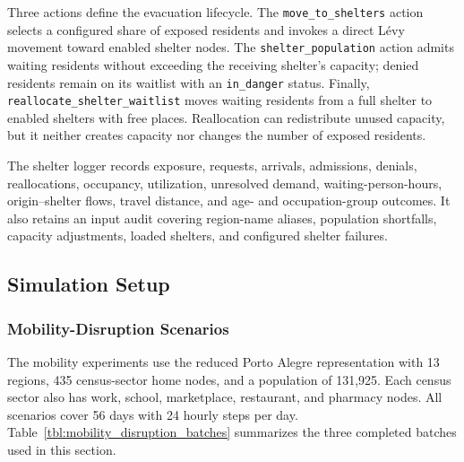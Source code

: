 Three actions define the evacuation lifecycle. The \texttt{move\_to\_shelters} action selects a configured share of exposed residents and invokes a direct L\'evy movement toward enabled shelter nodes. The \texttt{shelter\_population} action admits waiting residents without exceeding the receiving shelter's capacity; denied residents remain on its waitlist with an \texttt{in\_danger} status. Finally, \texttt{reallocate\_shelter\_waitlist} moves waiting residents from a full shelter to enabled shelters with free places. Reallocation can redistribute unused capacity, but it neither creates capacity nor changes the number of exposed residents.

The shelter logger records exposure, requests, arrivals, admissions, denials, reallocations, occupancy, utilization, unresolved demand, waiting-person-hours, origin--shelter flows, travel distance, and age- and occupation-group outcomes. It also retains an input audit covering region-name aliases, population shortfalls, capacity adjustments, loaded shelters, and configured shelter failures.

\subsection{Simulation Setup}
\label{sec:environment_disruption_setup}

\subsubsection{Mobility-Disruption Scenarios}

The mobility experiments use the reduced Porto Alegre representation with 13 regions, 435 census-sector home nodes, and a population of 131,925. Each census sector also has work, school, marketplace, restaurant, and pharmacy nodes. All scenarios cover 56 days with 24 hourly steps per day. Table~\ref{tbl:mobility_disruption_batches} summarizes the three completed batches used in this section.

